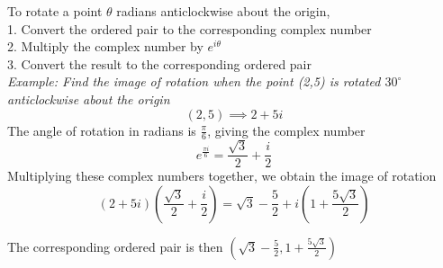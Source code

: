         \noindent To rotate a point $\theta$ radians anticlockwise about the origin, \\
        1. Convert the ordered pair to the corresponding complex number \\
        2. Multiply the complex number by $e^{i\theta}$ \\
        3. Convert the result to the corresponding ordered pair \\

        \noindent \textit{Example: Find the image of rotation when the point (2,5) is rotated
        $30^\circ$ anticlockwise about the origin} \\
        \begin{equation*}
            (2,5)\implies 2+5i
        \end{equation*}
        \noindent The angle of rotation in radians is $\frac{\pi}{6}$, giving the complex number \\
        \begin{equation*}
            e^{\frac{\pi i}{6}}=\frac{\sqrt{3}}{2}+\frac{i}{2}
        \end{equation*}
        \noindent Multiplying these complex numbers together, we obtain the image of rotation \\
        \begin{equation*}
            \left ( 2+5i\right )\left (\frac{\sqrt{3}}{2}+\frac{i}{2}\right)
            =
            \sqrt{3}-\frac{5}{2}+i \left (1+\frac{5\sqrt{3}}{2} \right )
        \end{equation*}

        \noindent The corresponding ordered pair is then
        $\left(\sqrt{3}-\frac{5}{2},1+\frac{5\sqrt{3}}{2}\right)$